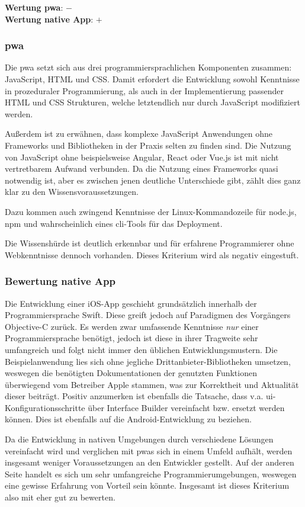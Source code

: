 \textbf{Wertung \ac{pwa}}: $-$\\
\textbf{Wertung native App}: $+$ \\

\subsubsection{\ac{pwa}}
Die \ac{pwa} setzt sich aus drei programmiersprachlichen Komponenten zusammen: JavaScript, HTML und CSS. Damit erfordert die Entwicklung sowohl Kenntnisse in prozeduraler Programmierung, als auch in der Implementierung passender HTML und CSS Strukturen, welche letztendlich nur durch JavaScript modifiziert werden.

Außerdem ist zu erwähnen, dass komplexe JavaScript Anwendungen ohne Frameworks und Bibliotheken in der Praxis selten zu finden sind. Die Nutzung von JavaScript ohne beispielsweise Angular, React oder Vue.js ist mit nicht vertretbarem Aufwand verbunden. Da die Nutzung eines Frameworks quasi notwendig ist, aber es zwischen jenen deutliche Unterschiede gibt, zählt dies ganz klar zu den Wissensvoraussetzungen.

Dazu kommen auch zwingend Kenntnisse der Linux-Kommandozeile für node.js, npm und wahrscheinlich eines \ac{cli}-Tools für das Deployment.

Die Wissenshürde ist deutlich erkennbar und für erfahrene Programmierer ohne Webkenntnisse dennoch vorhanden. Dieses Kriterium wird als negativ eingestuft.  

\subsubsection{Bewertung native App}
Die Entwicklung einer iOS-App geschieht grundsätzlich innerhalb der Programmiersprache Swift. Diese greift jedoch auf Paradigmen des Vorgängers Objective-C zurück. Es werden zwar umfassende Kenntnisse \textit{nur} einer Programmiersprache benötigt, jedoch ist diese in ihrer Tragweite sehr umfangreich und folgt nicht immer den üblichen Entwicklungsmustern. Die Beispielanwendung lies sich ohne jegliche Drittanbieter-Bibliotheken umsetzen, weswegen die benötigten Dokumentationen der genutzten Funktionen überwiegend vom Betreiber Apple stammen, was zur Korrektheit und Aktualität dieser beiträgt. Positiv anzumerken ist ebenfalls die Tatsache, dass v.a. \ac{ui}-Konfigurationsschritte über Interface Builder vereinfacht bzw. ersetzt werden können. Dies ist ebenfalls auf die Android-Entwicklung zu beziehen.

Da die Entwicklung in nativen Umgebungen durch verschiedene Lösungen vereinfacht wird und verglichen mit \acp{pwa} sich in einem Umfeld aufhält, werden insgesamt weniger Voraussetzungen an den Entwickler gestellt. Auf der anderen Seite handelt es sich um sehr umfangreiche Programmierumgebungen, weswegen eine gewisse Erfahrung von Vorteil sein könnte. Insgesamt ist dieses Kriterium also mit eher gut zu bewerten.